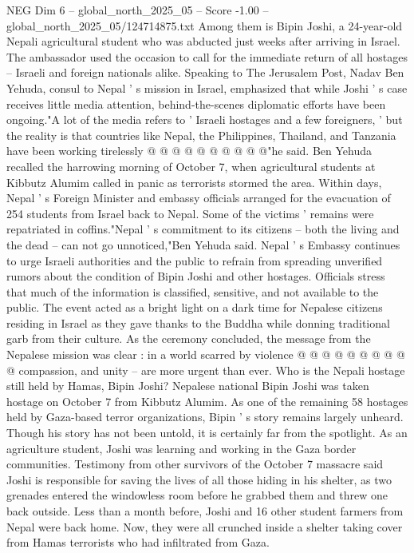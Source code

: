\begin{textsample}{NEG Dim 6 – global\_north\_2025\_05 – Score -1.00 – global\_north\_2025\_05/124714875.txt}
Among them is Bipin Joshi, a 24-year-old Nepali agricultural student who was abducted just weeks after arriving in Israel.
The ambassador used the occasion to call for the immediate return of all hostages -- Israeli and foreign nationals alike.
Speaking to The Jerusalem Post, Nadav Ben Yehuda, consul to Nepal ' s mission in Israel, emphasized that while Joshi ' s case receives little media attention, behind-the-scenes diplomatic efforts have been ongoing."A lot of the media refers to ' Israeli hostages and a few foreigners, ' but the reality is that countries like Nepal, the Philippines, Thailand, and Tanzania have been working tirelessly @ @ @ @ @ @ @ @ @ @"he said.
Ben Yehuda recalled the harrowing morning of October 7, when agricultural students at Kibbutz Alumim called in panic as terrorists stormed the area.
Within days, Nepal ' s Foreign Minister and embassy officials arranged for the evacuation of 254 students from Israel back to Nepal.
Some of the victims ' remains were repatriated in coffins."Nepal ' s commitment to its citizens -- both the living and the dead -- can not go unnoticed,"Ben Yehuda said.
Nepal ' s Embassy continues to urge Israeli authorities and the public to refrain from spreading unverified rumors about the condition of Bipin Joshi and other hostages.
Officials stress that much of the information is classified, sensitive, and not available to the public.
The event acted as a bright light on a dark time for Nepalese citizens residing in Israel as they gave thanks to the Buddha while donning traditional garb from their culture.
As the ceremony concluded, the message from the Nepalese mission was clear : in a world scarred by violence @ @ @ @ @ @ @ @ @ @ compassion, and unity -- are more urgent than ever.
Who is the Nepali hostage still held by Hamas, Bipin Joshi?
Nepalese national Bipin Joshi was taken hostage on October 7 from Kibbutz Alumim.
As one of the remaining 58 hostages held by Gaza-based terror organizations, Bipin ' s story remains largely unheard.
Though his story has not been untold, it is certainly far from the spotlight.
As an agriculture student, Joshi was learning and working in the Gaza border communities.
Testimony from other survivors of the October 7 massacre said Joshi is responsible for saving the lives of all those hiding in his shelter, as two grenades entered the windowless room before he grabbed them and threw one back outside.
Less than a month before, Joshi and 16 other student farmers from Nepal were back home.
Now, they were all crunched inside a shelter taking cover from Hamas terrorists who had infiltrated from Gaza.

\end{textsample}
